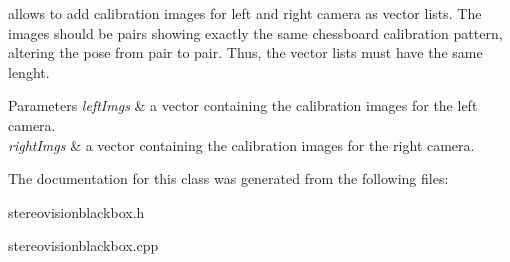 allows to add calibration images for left and right camera as vector lists. The images should be pairs showing exactly the same chessboard calibration pattern, altering the pose from pair to pair. Thus, the vector lists must have the same lenght. 


\begin{DoxyParams}{Parameters}
{\em left\-Imgs} & a vector containing the calibration images for the left camera. \\
\hline
{\em right\-Imgs} & a vector containing the calibration images for the right camera. \\
\hline
\end{DoxyParams}


The documentation for this class was generated from the following files\-:\begin{DoxyCompactItemize}
\item 
stereovisionblackbox.\-h\item 
stereovisionblackbox.\-cpp\end{DoxyCompactItemize}
